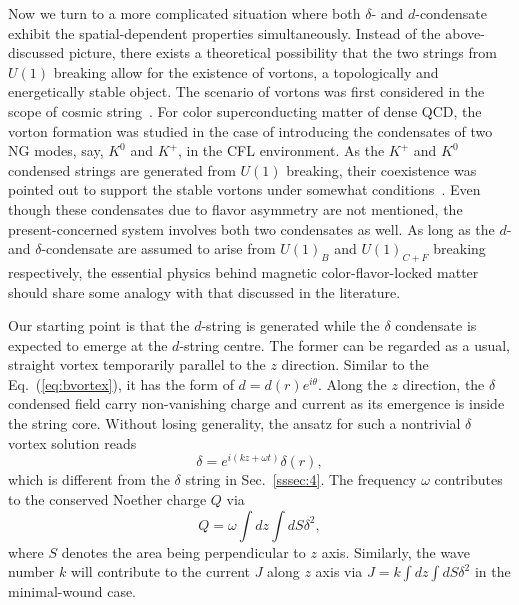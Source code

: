 \documentclass[prd, showpacs,nofootinbib,amsmath,amssymb]{revtex4}
\begin{document}
Now we turn to a more complicated situation where both $\delta$- and $d$-condensate exhibit the
spatial-dependent properties simultaneously. Instead of the above-discussed picture, there exists a
theoretical possibility that the two strings from $U(1)$ breaking allow for the existence of vortons,
a topologically and energetically stable object. The scenario of vortons was first considered in the
scope of cosmic
string~\cite{vilenkin2000cosmic,witten1985superconducting,davis1988physics1,davis1988physics2,haws1988superconducting}.
For color superconducting matter of dense QCD, the vorton formation was studied in the case of introducing the
condensates of two NG modes, say, $K^0$ and $K^+$, in the CFL environment. As the $K^+$ and $K^0$ condensed strings are generated from $U(1)$ breaking, their coexistence was pointed out to support the stable vortons under somewhat conditions~\cite{kaplan2002charged,buckley2002superconducting}. 
Even though these condensates due to flavor asymmetry are not mentioned, the present-concerned system involves both two condensates as well. As long as the $d$- and
$\delta$-condensate are assumed to arise from $U(1)_B$ and $U(1)_{C+F}$ breaking respectively, the essential physics
behind magnetic color-flavor-locked matter should share some analogy with that discussed in the literature.
%

Our starting point is that the $d$-string is generated while the $\delta$ condensate is expected to emerge
at the $d$-string centre. The former can be regarded as a usual, straight vortex temporarily parallel to the
$z$ direction. Similar to the Eq.~(\ref{eq:bvortex}), it has the form of $d = d(r)e^{i\theta}$.
Along the $z$ direction, the $\delta$ condensed field carry non-vanishing charge and current as its emergence
is inside the string core. Without losing generality, the ansatz for such a nontrivial $\delta$ vortex solution reads
\begin{equation}
  \label{eq:delta}
  \delta =  e^{i(kz+\omega t)}\delta(r),
\end{equation}
which is different from the $\delta$ string in Sec.~\ref{sssec:4}. The frequency $\omega$ contributes to the conserved
Noether charge $Q$ via
 \begin{equation}
  \label{eq:vortonquantumq}
   Q = \omega\int dz \int dS \delta^2,
 \end{equation}
where $S$ denotes the area being perpendicular to $z$ axis. Similarly, the wave number $k$ will contribute to the
current $J$ along $z$ axis via $J =k\int dz \int dS \delta^2$ in the minimal-wound case.
\end{document}

